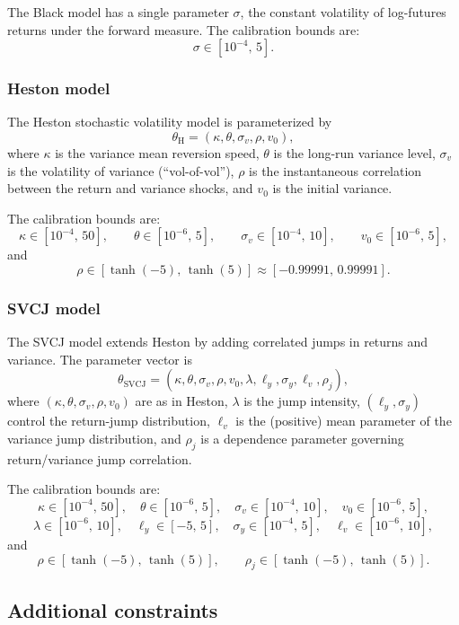 \documentclass[a4paper,titlepage,12pt]{report}
\theoremstyle{plain}
\begin{document}
The Black model has a single parameter $\sigma$, the constant volatility of log-futures returns under the forward measure. The calibration bounds are:
\[
\sigma \in [10^{-4},\, 5].
\]

\subsubsection{Heston model}

The Heston stochastic volatility model is parameterized by
\[
\theta_{\text{H}} = (\kappa,\theta,\sigma_v,\rho,v_0),
\]
where $\kappa$ is the variance mean reversion speed, $\theta$ is the long-run variance level, $\sigma_v$ is the volatility of variance (``vol-of-vol''), $\rho$ is the instantaneous correlation between the return and variance shocks, and $v_0$ is the initial variance.

The calibration bounds are:
\[
\kappa \in [10^{-4},\, 50],\qquad
\theta \in [10^{-6},\, 5],\qquad
\sigma_v \in [10^{-4},\, 10],\qquad
v_0 \in [10^{-6},\, 5],
\]
and
\[
\rho \in [\tanh(-5),\, \tanh(5)] \approx [-0.99991,\, 0.99991].
\]

\subsubsection{SVCJ model}

The SVCJ model extends Heston by adding correlated jumps in returns and variance. The parameter vector is
\[
\theta_{\text{SVCJ}} =
(\kappa,\theta,\sigma_v,\rho,v_0,\lambda,\ell_y,\sigma_y,\ell_v,\rho_j),
\]
where $(\kappa,\theta,\sigma_v,\rho,v_0)$ are as in Heston, $\lambda$ is the jump intensity, $(\ell_y,\sigma_y)$ control the return-jump distribution, $\ell_v$ is the (positive) mean parameter of the variance jump distribution, and $\rho_j$ is a dependence parameter governing return/variance jump correlation.

The calibration bounds are:
\[
\kappa \in [10^{-4},\, 50],\quad
\theta \in [10^{-6},\, 5],\quad
\sigma_v \in [10^{-4},\, 10],\quad
v_0 \in [10^{-6},\, 5],
\]
\[
\lambda \in [10^{-6},\, 10],\quad
\ell_y \in [-5,\, 5],\quad
\sigma_y \in [10^{-4},\, 5],\quad
\ell_v \in [10^{-6},\, 10],
\]
and
\[
\rho \in [\tanh(-5),\, \tanh(5)],\qquad
\rho_j \in [\tanh(-5),\, \tanh(5)].
\]

\subsection{Additional constraints}\label{subsec:constraints}
\end{document}
